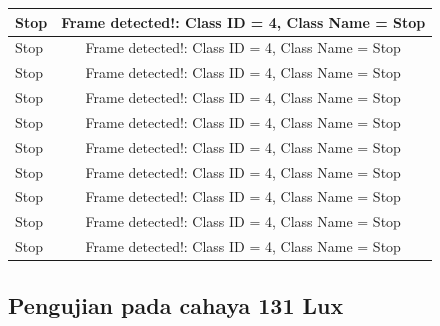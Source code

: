 \begin{longtable}{|l|c|}
  Stop           & Frame detected!: Class ID = 4, Class Name = Stop \\ \hline
  Stop           & Frame detected!: Class ID = 4, Class Name = Stop \\ \hline
  Stop           & Frame detected!: Class ID = 4, Class Name = Stop \\ \hline
  Stop           & Frame detected!: Class ID = 4, Class Name = Stop \\ \hline
  Stop           & Frame detected!: Class ID = 4, Class Name = Stop \\ \hline
  Stop           & Frame detected!: Class ID = 4, Class Name = Stop \\ \hline
  Stop           & Frame detected!: Class ID = 4, Class Name = Stop \\ \hline
  Stop           & Frame detected!: Class ID = 4, Class Name = Stop \\ \hline
  Stop           & Frame detected!: Class ID = 4, Class Name = Stop \\ \hline
  Stop           & Frame detected!: Class ID = 4, Class Name = Stop \\ \hline
\end{longtable}

\subsection{Pengujian pada cahaya 131 Lux}

